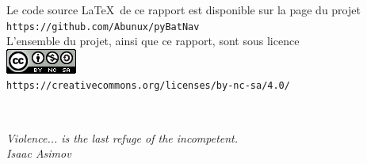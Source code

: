 \begin{center}
Le code source \LaTeX\ de ce rapport est disponible sur la page du projet\\ \medskip
\texttt{https://github.com/Abunux/pyBatNav}\\ 
\vfill
L'ensemble du projet, ainsi que ce rapport, sont sous licence\\ \medskip
\includegraphics[scale=1]{./media/CC-Logo.png}\\
\texttt{https://creativecommons.org/licenses/by-nc-sa/4.0/}
\end{center}

\newpage
\ \\
\vspace{3cm}
\begin{flushright}


\textit{Violence... is the last refuge of the incompetent.\\
\medskip
Isaac Asimov
}

\end{flushright}
\vfill

\clearpage{\pagestyle{empty}\cleardoublepage}
\setcounter{tocdepth}{2}
\tableofcontents